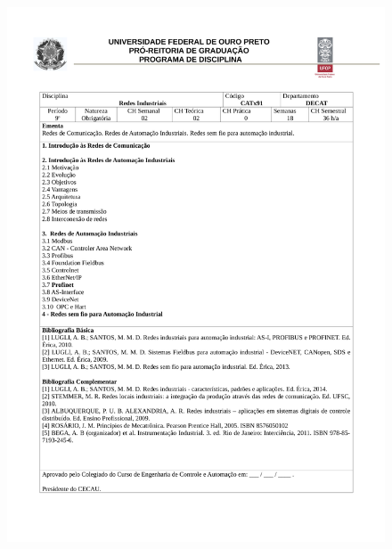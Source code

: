 \begin{figure}[p]
	\centering 
	\includegraphics[scale=0.7]{capitulos/anexo1-programas-disciplina/p94.pdf}
\end{figure}


